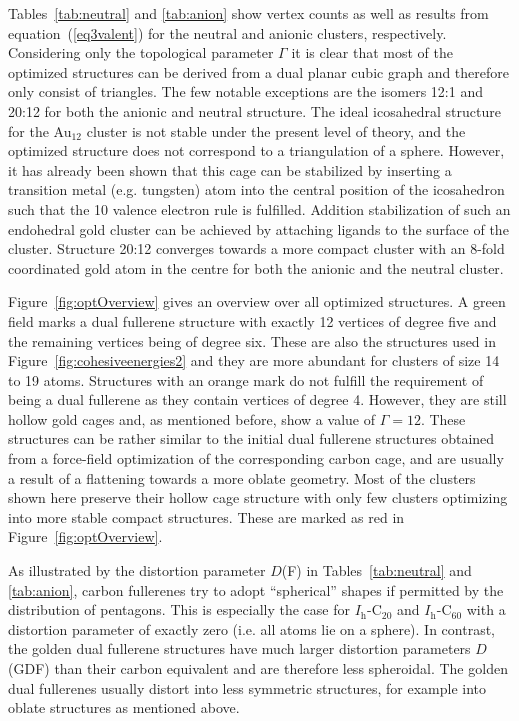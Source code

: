 Tables~\ref{tab:neutral} and \ref{tab:anion} show vertex counts as well as
results from equation~(\ref{eq3valent}) for the neutral and anionic clusters,
respectively. Considering only the topological parameter $\Gamma$ it is clear
that most of the optimized structures can be derived from a dual planar cubic
graph and therefore only consist of triangles. The few notable exceptions are
the isomers 12:1 and 20:12 for both the anionic and neutral structure. The
ideal icosahedral structure for the Au$_{12}$ cluster is not stable under the
present level of theory, and the optimized structure does not correspond to a
triangulation of a sphere. However, it has already been shown that this cage
can be stabilized by inserting a transition metal (e.g. tungsten) atom into the
central position of the icosahedron such that the 10 valence electron rule is
fulfilled.\autocite{Pyykko_IcosahedralWAu12Predicted_2002,Autschbach_PropertiesWAu12_2004}
Addition stabilization of such an endohedral gold cluster can be achieved by
attaching ligands to the surface of the cluster.\autocite{Laupp-1994} Structure
20:12 converges towards a more compact cluster with an 8-fold coordinated gold
atom in the centre for both the anionic and the neutral cluster.  

Figure~\ref{fig:optOverview} gives an overview over all optimized structures.
A green field marks a dual fullerene structure with exactly 12 vertices of
degree five and the remaining vertices being of degree six. These are also the
structures used in Figure~\ref{fig:cohesiveenergies2} and they are more
abundant for clusters of size 14 to 19 atoms. Structures with an orange mark do
not fulfill the requirement of being a dual fullerene as they contain vertices
of degree 4. However, they are still hollow gold cages and, as mentioned
before, show a value of $\Gamma=12$. These structures can be rather similar to
the initial dual fullerene structures obtained from a force-field optimization
of the corresponding carbon cage, and are usually a result of a flattening
towards a more oblate geometry.  Most of the clusters shown here preserve their
hollow cage structure with only few clusters optimizing into more stable
compact structures. These are marked as red in Figure~\ref{fig:optOverview}.


As illustrated by the distortion parameter $D$(F) in Tables~\ref{tab:neutral}
and \ref{tab:anion}, carbon fullerenes try to adopt ``spherical'' shapes if
permitted by the distribution of pentagons. This is especially the case for
$I_\mathrm{h}$-C$_{20}$ and $I_\mathrm{h}$-C$_{60}$ with a distortion parameter
of exactly zero (i.e. all atoms lie on a sphere).  In contrast, the golden dual
fullerene structures have much larger distortion parameters $D$(GDF) than their
carbon equivalent and are therefore less spheroidal. The golden dual fullerenes
usually distort into less symmetric structures, for example into oblate
structures as mentioned above.

